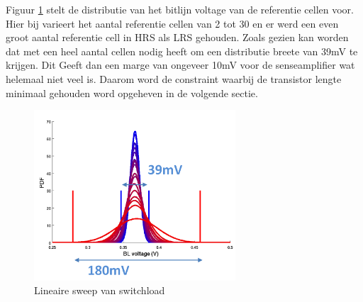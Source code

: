 Figuur \ref{fig:distref} stelt de distributie van het bitlijn voltage van de referentie cellen voor. Hier bij varieert het aantal referentie cellen van 2 tot 30 en er werd een even groot aantal referentie cell in HRS als LRS gehouden. Zoals gezien kan worden dat met een heel aantal cellen nodig heeft om een distributie breete van 39mV te krijgen. Dit Geeft dan een marge van ongeveer 10mV voor de senseamplifier wat helemaal niet veel is. Daarom word de constraint waarbij de transistor lengte minimaal gehouden word opgeheven in de volgende sectie.

\begin{figure}[!ht]
  \centering
  \includegraphics[width=0.67\textwidth]{../fig/hfdst-last-ref.png}
  \caption{Lineaire sweep van switchload}
  \label{fig:distref}
\end{figure}


